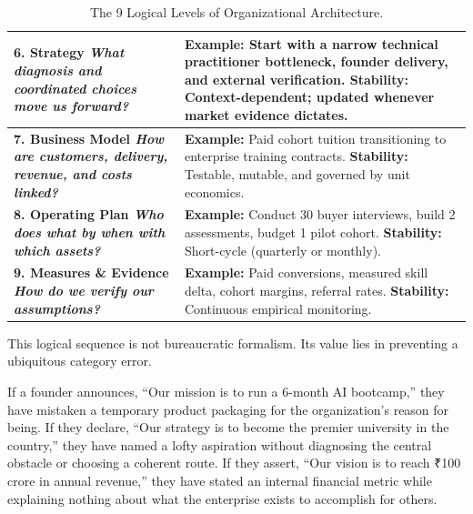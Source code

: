 \begin{table}[htbp]
\begin{tcolorbox}[
  enhanced,
  colback=white,
  colframe=BayesBorder!80!white,
  boxrule=0.4pt,
  arc=2pt,
  left=3pt,right=3pt,top=3pt,bottom=3pt,
  before skip=3pt,after skip=4pt
]
\begin{tabularx}{\linewidth}{@{} >{\bfseries\color{BayesInk}}p{2.2cm} >{\color{BayesInk}}X @{}}
\midrule
6. Strategy\newline
\textit{What diagnosis and coordinated choices move us forward?} & 
\textbf{Example:} Start with a narrow technical practitioner bottleneck, founder delivery, and external verification.\newline
\textbf{Stability:} Context-dependent; updated whenever market evidence dictates. \\
\midrule
7. Business Model\newline
\textit{How are customers, delivery, revenue, and costs linked?} & 
\textbf{Example:} Paid cohort tuition transitioning to enterprise training contracts.\newline
\textbf{Stability:} Testable, mutable, and governed by unit economics. \\
\midrule
8. Operating Plan\newline
\textit{Who does what by when with which assets?} & 
\textbf{Example:} Conduct 30 buyer interviews, build 2 assessments, budget 1 pilot cohort.\newline
\textbf{Stability:} Short-cycle (quarterly or monthly). \\
\midrule
9. Measures \& Evidence\newline
\textit{How do we verify our assumptions?} & 
\textbf{Example:} Paid conversions, measured skill delta, cohort margins, referral rates.\newline
\textbf{Stability:} Continuous empirical monitoring. \\
\bottomrule
\end{tabularx}
\end{tcolorbox}
\caption{The 9 Logical Levels of Organizational Architecture.}
\label{tab:logical-levels}
\end{table}

This logical sequence is not bureaucratic formalism. Its value lies in preventing a ubiquitous category error.

If a founder announces, ``Our mission is to run a 6-month AI bootcamp,'' they have mistaken a temporary product packaging for the organization's reason for being. If they declare, ``Our strategy is to become the premier university in the country,'' they have named a lofty aspiration without diagnosing the central obstacle or choosing a coherent route. If they assert, ``Our vision is to reach ₹100 crore in annual revenue,'' they have stated an internal financial metric while explaining nothing about what the enterprise exists to accomplish for others.


